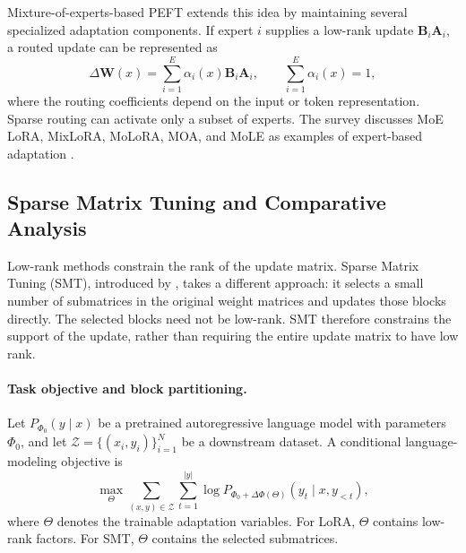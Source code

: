 Mixture-of-experts-based PEFT extends this idea by maintaining several
specialized adaptation components. If expert $i$ supplies a low-rank update
$\mathbf{B}_i\mathbf{A}_i$, a routed update can be represented as
\begin{equation}
    \Delta\mathbf{W}(x)
    =
    \sum_{i=1}^{E}
    \alpha_i(x)\mathbf{B}_i\mathbf{A}_i,
    \qquad
    \sum_{i=1}^{E}\alpha_i(x)=1,
    \label{eq:peft-moe-lora}
\end{equation}
where the routing coefficients depend on the input or token representation.
Sparse routing can activate only a subset of experts. The survey discusses
MoE LoRA, MixLoRA, MoLoRA, MOA, and MoLE as examples of expert-based
adaptation \parencite{prottasha2025peft}.

\subsection{Sparse Matrix Tuning and Comparative Analysis}
\label{subsec:peft-smt-comparison}

Low-rank methods constrain the rank of the update matrix. Sparse Matrix
Tuning (SMT), introduced by \textcite{he2025smt}, takes a different approach:
it selects a small number of submatrices in the original weight matrices and
updates those blocks directly. The selected blocks need not be low-rank.
SMT therefore constrains the support of the update, rather than requiring the
entire update matrix to have low rank.

\paragraph{Task objective and block partitioning.}
Let $P_{\Phi_0}(y\mid x)$ be a pretrained autoregressive language model with
parameters $\Phi_0$, and let
$\mathcal{Z}=\{(x_i,y_i)\}_{i=1}^{N}$ be a downstream dataset. A conditional
language-modeling objective is
\begin{equation}
    \max_{\Theta}
    \sum_{(x,y)\in\mathcal{Z}}
    \sum_{t=1}^{|y|}
    \log
    P_{\Phi_0+\Delta\Phi(\Theta)}
    (y_t\mid x,y_{<t}),
    \label{eq:smt-objective}
\end{equation}
where $\Theta$ denotes the trainable adaptation variables. For LoRA,
$\Theta$ contains low-rank factors. For SMT, $\Theta$ contains the selected
submatrices.

